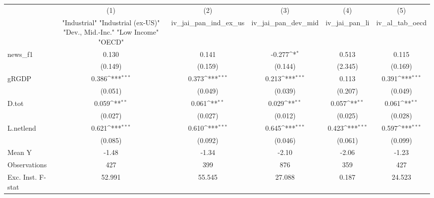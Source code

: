 {
\def\sym#1{\ifmmode^{#1}\else\(^{#1}\)\fi}
\begin{tabular}{l*{5}{c}}
\toprule
            &\multicolumn{1}{c}{(1)}&\multicolumn{1}{c}{(2)}&\multicolumn{1}{c}{(3)}&\multicolumn{1}{c}{(4)}&\multicolumn{1}{c}{(5)}\\
            &\multicolumn{1}{c}{ "Industrial" "Industrial (ex-US)" "Dev., Mid.-Inc." "Low Income" "OECD" }&\multicolumn{1}{c}{iv\_jai\_pan\_ind\_ex\_us}&\multicolumn{1}{c}{iv\_jai\_pan\_dev\_mid}&\multicolumn{1}{c}{iv\_jai\_pan\_li}&\multicolumn{1}{c}{iv\_al\_tab\_oecd}\\
\midrule
news\_f1     &       0.130         &       0.141         &      -0.277\sym{*}  &       0.513         &       0.115         \\
            &     (0.149)         &     (0.159)         &     (0.144)         &     (2.345)         &     (0.169)         \\
\addlinespace
gRGDP       &       0.386\sym{***}&       0.373\sym{***}&       0.213\sym{***}&       0.113         &       0.391\sym{***}\\
            &     (0.051)         &     (0.049)         &     (0.039)         &     (0.207)         &     (0.049)         \\
\addlinespace
D.tot       &       0.059\sym{**} &       0.061\sym{**} &       0.029\sym{**} &       0.057\sym{**} &       0.061\sym{**} \\
            &     (0.027)         &     (0.027)         &     (0.012)         &     (0.025)         &     (0.028)         \\
\addlinespace
L.netlend   &       0.621\sym{***}&       0.610\sym{***}&       0.645\sym{***}&       0.423\sym{***}&       0.597\sym{***}\\
            &     (0.085)         &     (0.092)         &     (0.046)         &     (0.061)         &     (0.099)         \\
\midrule
Mean Y      &       -1.48         &       -1.34         &       -2.10         &       -2.06         &       -1.23         \\
Observations&         427         &         399         &         876         &         359         &         427         \\
Exc. Inst. F-stat&      52.991         &      55.545         &      27.088         &       0.187         &      24.523         \\
\bottomrule
\end{tabular}
}
